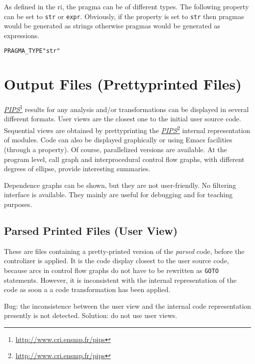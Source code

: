 \documentclass[a4paper]{report}
\newenvironment{PipsProp}{\begin{alltt}}{\end{alltt}}
\newcommand{\LINK}[2]{\href{#2}{#1}\footnote{\url{#2}}\xspace}
\newcommand{\PIPS}{\LINK{\emph{PIPS}}{http://www.cri.ensmp.fr/pips}}
\begin{document}
As defined in the ri, the pragma can be of different types. The following
property can be set to \verb|str| or \verb|expr|. Obviously, if the
property is set to \verb|str| then pragmas would be generated as strings
otherwise pragmas would be generated as expressions.
\begin{PipsProp}
PRAGMA_TYPE    "str"
\end{PipsProp}


\chapter{Output Files (Prettyprinted Files)}
\label{section-output-files}

\PIPS{} results for any analysis and/or transformations can be
displayed in several different formats. User views are the closest one
to the initial user source code. Sequential views are obtained by
prettyprinting the \PIPS{} internal representation of modules. Code
can also be displayed graphically or using Emacs facilities (through a
property). Of course, parallelized versions are available. At the
program level, call graph and interprocedural control flow graphs,
with different degrees of ellipse, provide interesting summaries.

Dependence graphs can be shown, but they are not user-friendly. No
filtering interface is available. They mainly are useful for debugging
and for teaching purposes.

\section{Parsed Printed Files (User View)}

\label{sec:parsed_printed_files}
\label{subsection-parsed-printed-files}
These are files containing a pretty-printed version of the {\em parsed} code,
before the controlizer is applied. It is the code display closest to the
user source code, because arcs in control flow graphs do not have to be
rewritten as {\tt GOTO} statements. However, it is inconsistent with the
internal representation of the code as soon a a code transformation
has been applied.

Bug: the inconsistence between the user view and the internal code
representation presently is not detected. Solution: do not use user views.
\end{document}
